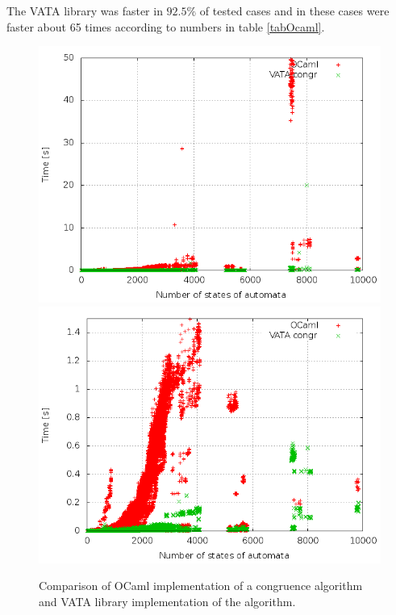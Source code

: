 The VATA library was faster in $92.5\%$ of tested cases and in these cases were faster about 65 times according to numbers in table \ref{tabOcaml}.

\begin{figure}[bt]
\begin{center}
\includegraphics[scale=0.3]{fig/plot_hkc_zprava.png}
\includegraphics[scale=0.3]{fig/plot_hkc_step_zprava.png}
\caption{
Comparison of OCaml implementation of a congruence algorithm and VATA library implementation of the algorithm.}
\label{fig:figGraphOCaml}
\end{center}
\end{figure}

